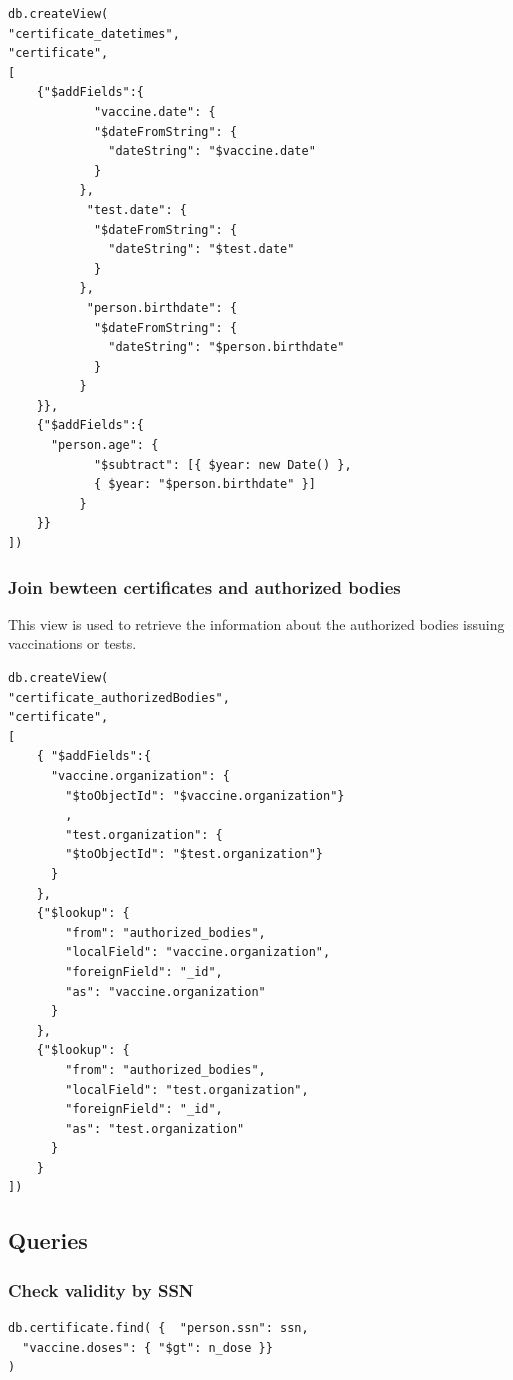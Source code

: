 \documentclass[12pt, a4paper]{article}
\begin{document}
\begin{tcolorbox}[fontupper=\scriptsize]
    \begin{verbatim}
db.createView(
"certificate_datetimes", 
"certificate", 
[
	{"$addFields":{
	        "vaccine.date": {
	        "$dateFromString": {
	          "dateString": "$vaccine.date"
	        }
	      },	       
	       "test.date": {
	        "$dateFromString": {
	          "dateString": "$test.date"
	        }
	      },      
	       "person.birthdate": {
	        "$dateFromString": {
	          "dateString": "$person.birthdate"
	        }
	      }
	}},
	{"$addFields":{
	  "person.age": {
	        "$subtract": [{ $year: new Date() },
	        { $year: "$person.birthdate" }]
	      }
	}}
])
    \end{verbatim}
\end{tcolorbox}

\subsubsection{Join bewteen certificates and authorized bodies}
This view is used to retrieve the information about the authorized bodies issuing vaccinations or tests.
\begin{tcolorbox}[fontupper=\scriptsize]
    \begin{verbatim}
db.createView(
"certificate_authorizedBodies", 
"certificate", 
[
	{ "$addFields":{
	  "vaccine.organization": {
	    "$toObjectId": "$vaccine.organization"}
	    ,  
	    "test.organization": {
	    "$toObjectId": "$test.organization"}
	  }
	},
	{"$lookup": {
	    "from": "authorized_bodies",
	    "localField": "vaccine.organization",
	    "foreignField": "_id",
	    "as": "vaccine.organization"
	  }
	},
	{"$lookup": {
	    "from": "authorized_bodies",
	    "localField": "test.organization",
	    "foreignField": "_id",
	    "as": "test.organization"
	  }
	}
])
    \end{verbatim}
\end{tcolorbox}

\subsection{Queries}

\subsubsection{Check validity by SSN}
\begin{tcolorbox}[fontupper=\scriptsize]
    \begin{verbatim}
db.certificate.find( {  "person.ssn": ssn,
  "vaccine.doses": { "$gt": n_dose }}
)
    \end{verbatim}
\end{tcolorbox}
\end{document}
